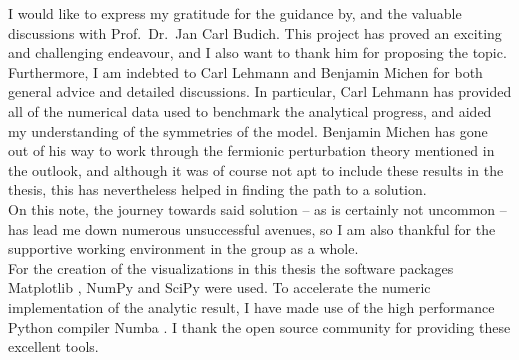\clearpage
\thispagestyle{empty}
\vspace*{1.5em}
I would like to express my gratitude for the guidance by, and the valuable discussions with Prof.~Dr.~Jan Carl Budich.
This project has proved an exciting and challenging endeavour, and I also want to thank him for proposing the topic.
Furthermore, I am indebted to Carl Lehmann and Benjamin Michen for both general advice and detailed discussions.
In particular, Carl Lehmann has provided all of the numerical data used to benchmark the analytical progress, and aided my understanding of the symmetries of the model.
Benjamin Michen has gone out of his way to work through the fermionic perturbation theory mentioned in the outlook, and although it was of course not apt to include these results in the thesis, this has nevertheless helped in finding the path to a solution.\\
On this note, the journey towards said solution -- as is certainly not uncommon -- has lead me down numerous unsuccessful avenues, so I am also thankful for the supportive working environment in the group as a whole.\\
For the creation of the visualizations in this thesis the software packages Matplotlib \cite{Matplotlib_2007}, NumPy \cite{Numpy_2020} and SciPy \cite{Scipy_2020} were used.
To accelerate the numeric implementation of the analytic result, I have made use of the high performance Python compiler Numba \cite{Numba}.
I thank the open source community for providing these excellent tools.